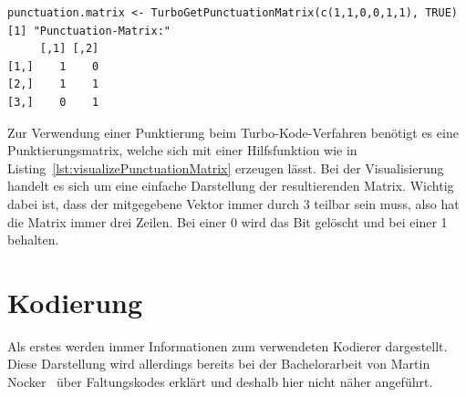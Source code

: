 \begin{lstlisting}[caption=Visualisierung der Punktierungssmatrix, label={lst:visualizePunctuationMatrix}, float=th]
punctuation.matrix <- TurboGetPunctuationMatrix(c(1,1,0,0,1,1), TRUE)
[1] "Punctuation-Matrix:"
     [,1] [,2]
[1,]    1    0
[2,]    1    1
[3,]    0    1
\end{lstlisting}

Zur Verwendung einer Punktierung beim Turbo-Kode-Verfahren benötigt es eine Punktierungsmatrix, welche sich mit einer Hilfsfunktion wie in Listing~\ref{lst:visualizePunctuationMatrix} erzeugen lässt. Bei der Visualisierung handelt es sich um eine einfache Darstellung der resultierenden Matrix. Wichtig dabei ist, dass der mitgegebene Vektor immer durch 3 teilbar sein muss, also hat die Matrix immer drei Zeilen. Bei einer 0 wird das Bit gelöscht und bei einer 1 behalten.

\FloatBarrier
\section{Kodierung}
\label{sec:visualization_encode}
Als erstes werden immer Informationen zum verwendeten Kodierer dargestellt. Diese Darstellung wird allerdings bereits bei der Bachelorarbeit von Martin Nocker~\cite[44]{nocker} über Faltungskodes erklärt und deshalb hier nicht näher angeführt.

